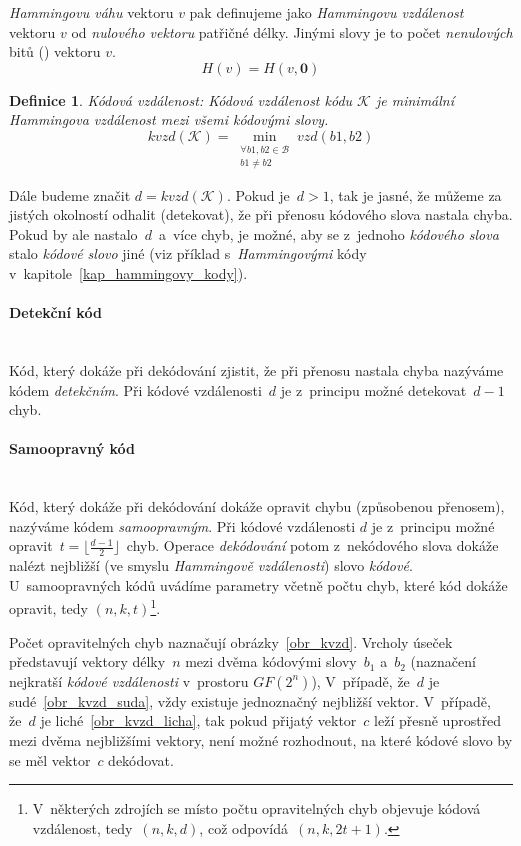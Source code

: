 \documentclass[thesis=M,czech,hidelinks]{FITthesis}[2012/06/26]
\newcommand{\0}{{\textcolor[gray]{0.75}{0}}}
\newtheorem{definice}{Definice}
\begin{document}
\emph{Hammingovu váhu} vektoru $v$ pak definujeme jako \emph{Hammingovu
vzdálenost} vektoru $v$ od \emph{nulového vektoru} patřičné délky. Jinými slovy
je to počet \emph{nenulových} bitů () vektoru $v$.
$$ H(v) = H(v,\mathbf{0}) $$


\begin{definice}{Kódová vzdálenost:}
    Kódová vzdálenost kódu $\mathcal{K}$ je minimální \emph{Hammingova
    vzdálenost} mezi všemi kódovými slovy.
    $$
        kvzd(\mathcal{K}) =
        \min_{\substack{\forall b1,b2 \in \mathcal{B} \\ b1 \neq b2}} vzd(b1,b2)
    $$
\end{definice}

Dále budeme značit $d = kvzd(\mathcal{K})$. Pokud je~$d > 1$, tak je jasné, že
můžeme za jistých okolností odhalit (detekovat), že při přenosu kódového slova
nastala chyba. Pokud by ale nastalo~$d$~a~více chyb, je možné, aby se z~jednoho
\emph{kódového slova} stalo \emph{kódové slovo} jiné (viz příklad
s~\emph{Hammingovými} kódy v~kapitole~\ref{kap_hammingovy_kody}).

\paragraph{Detekční kód} \hfil \\
Kód, který dokáže při dekódování zjistit, že při přenosu nastala chyba nazýváme
kódem \emph{detekčním}. Při kódové vzdálenosti~$d$ je z~principu možné
detekovat~$d-1$ chyb.

\paragraph{Samoopravný kód} \hfil \\
Kód, který dokáže při dekódování dokáže opravit chybu (způsobenou přenosem),
nazýváme kódem \emph{samoopravným}. Při kódové vzdálenosti $d$ je z~principu
možné opravit~$t = \lfloor \frac{d-1}{2} \rfloor$~chyb. Operace
\emph{dekódování} potom z~nekódového slova dokáže nalézt nejbližší (ve smyslu
\emph{Hammingově vzdálenosti}) slovo \emph{kódové}. U~samoopravných kódů uvádíme
parametry včetně počtu chyb, které kód dokáže opravit, tedy $(n,k,t)$\footnote{
    V~některých zdrojích se místo počtu opravitelných chyb objevuje kódová
    vzdálenost, tedy~$(n,k,d)$, což odpovídá~$(n,k,2t+1)$.
}.


Počet opravitelných chyb naznačují obrázky~\ref{obr_kvzd}. Vrcholy úseček
představují vektory délky~$n$ mezi dvěma kódovými slovy~$b_1$ a~$b_2$ (naznačení
nejkratší \emph{kódové vzdálenosti} v~prostoru $GF(2^n)$), V~případě, že~$d$ je
sudé~\ref{obr_kvzd_suda}, vždy existuje jednoznačný nejbližší vektor. V~případě,
že~$d$ je liché~\ref{obr_kvzd_licha}, tak pokud přijatý vektor~$c$ leží přesně
uprostřed mezi dvěma nejbližšími vektory, není možné rozhodnout, na které kódové
slovo by se měl vektor~$c$ dekódovat.
\end{document}

